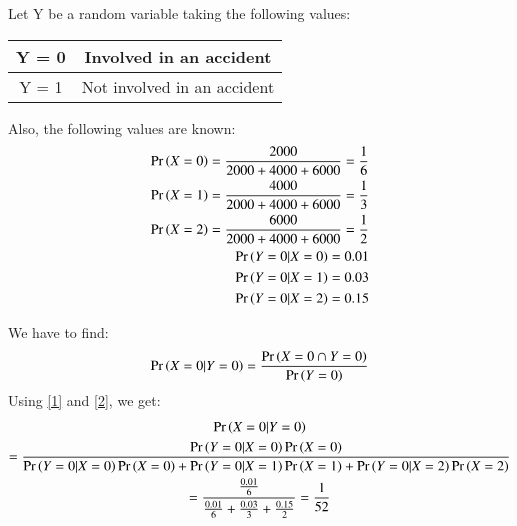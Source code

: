 \documentclass[journal,12pt,twocolumn]{IEEEtran}
\begin{document}
Let Y be a random variable taking the following values:
\begin{center}
\begin{tabular}{ |c|c| } 
 \hline
 Y = 0 & Involved in an accident\\
 \hline
 Y = 1 & Not involved in an accident\\
 \hline
\end{tabular}
\end{center}

\par

 Also, the following values are known:
\begin{align}
\Pr\left(X = 0\right) = \frac{2000}{2000+4000+6000} = \frac{1}{6}\\
\Pr\left(X = 1\right) = \frac{4000}{2000+4000+6000} = \frac{1}{3}\\
\Pr\left(X = 2\right) = \frac{6000}{2000+4000+6000} = \frac{1}{2}\\
\Pr\left(Y = 0|X = 0\right) = 0.01\\
\Pr\left(Y = 0|X = 1\right) = 0.03\\
\Pr\left(Y = 0|X = 2\right) = 0.15
\end{align}

We have to find:
\begin{align}
\Pr\left(X = 0|Y = 0\right) = \frac{\Pr\left(X = 0 \cap Y = 0\right)}{\Pr\left(Y = 0\right)}
\end{align}
Using \eqref{1} and \eqref{2}, we get:
{\scriptsize
\begin{multline}
\Pr\left(X = 0|Y = 0\right) 
\\
= \frac{\Pr\left(Y = 0|X = 0\right)\Pr\left(X = 0\right)}{\Pr\left(Y = 0|X = 0\right)\Pr\left(X = 0\right)+\Pr\left(Y = 0|X = 1\right)\Pr\left(X = 1\right)+\Pr\left(Y = 0|X = 2\right)\Pr\left(X = 2\right)}
\\
= \frac{\frac{0.01}{6}}{\frac{0.01}{6} + \frac{0.03}{3} + \frac{0.15}{2}}
 = \frac{1}{52}
\end{multline}
}
\end{document}
